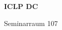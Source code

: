 \documentclass[a4paper]{article}
\begin{document}
\printGenericVSLHeader
\begin{center}
\begin{vsltext}{3cm}{4cm}

   \vspace{0.5cm} 

    \textbf{ICLP DC} 

    \vspace{1.5cm}

    Seminarraum 107

\end{vsltext}

\end{center}
\end{document}
